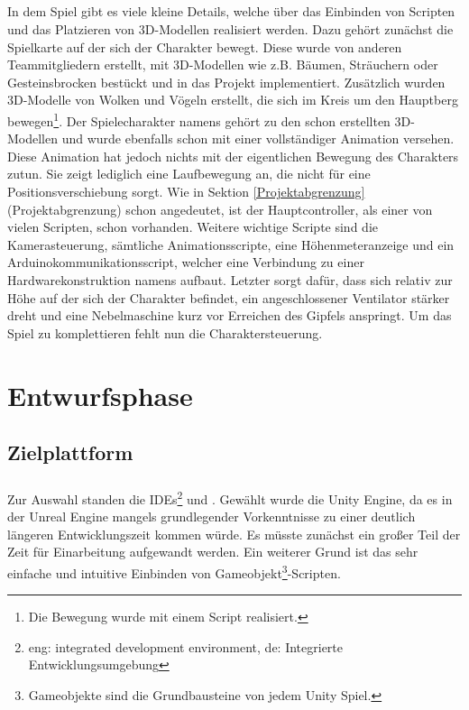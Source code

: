 \paragraph{}
In dem Spiel gibt es viele kleine Details, welche über das Einbinden von Scripten und das Platzieren von 3D-Modellen realisiert werden. Dazu gehört zunächst die Spielkarte auf der sich der Charakter bewegt. Diese wurde von anderen Teammitgliedern erstellt, mit 3D-Modellen wie z.B. Bäumen, Sträuchern oder Gesteinsbrocken bestückt und in das Projekt implementiert. Zusätzlich wurden 3D-Modelle von Wolken und Vögeln erstellt, die sich im Kreis um den Hauptberg bewegen\footnote{Die Bewegung wurde mit einem Script realisiert.}.
Der Spielecharakter namens  gehört zu den schon erstellten 3D-Modellen und wurde ebenfalls schon mit einer vollständiger Animation versehen. Diese Animation hat jedoch nichts mit der eigentlichen Bewegung des Charakters zutun. Sie zeigt lediglich eine Laufbewegung an, die nicht für eine Positionsverschiebung sorgt. 
Wie in Sektion \ref{Projektabgrenzung} (Projektabgrenzung) schon angedeutet, ist der Hauptcontroller, als einer von vielen Scripten, schon vorhanden. Weitere wichtige Scripte sind die Kamerasteuerung, sämtliche Animationsscripte, eine Höhenmeteranzeige und ein Arduinokommunikationsscript, welcher eine Verbindung zu einer Hardwarekonstruktion namens  aufbaut. Letzter sorgt dafür, dass sich relativ zur Höhe auf der sich der Charakter befindet, ein angeschlossener Ventilator stärker dreht und eine Nebelmaschine kurz vor Erreichen des Gipfels anspringt.
Um das Spiel zu komplettieren fehlt nun die Charaktersteuerung.

\chapter{Entwurfsphase}
\section{Zielplattform}
\paragraph{}
Zur Auswahl standen die IDEs\footnote{eng: integrated development environment, de: Integrierte Entwicklungsumgebung}  und . Gewählt wurde die Unity Engine, da es in der Unreal Engine mangels grundlegender Vorkenntnisse zu einer deutlich längeren Entwicklungszeit kommen würde. Es müsste zunächst ein großer Teil der Zeit für Einarbeitung aufgewandt werden. 
Ein weiterer Grund ist das sehr einfache und intuitive Einbinden von Gameobjekt\footnote{Gameobjekte sind die Grundbausteine von jedem Unity Spiel.}-Scripten.

